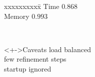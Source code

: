 \begin{frame}[fragile,label=ss-scaling]
\begin{center}
\begin{minipage}{4.0in}
\begin{minipage}[t]{1.20in}
\begin{block}
\begin{tabbing}
xxxxxxxxxx\=\kill
Time \> $0.868$ \\
Memory \> $0.993$
\end{tabbing}
\end{block}
\end{minipage} \
\begin{minipage}[t]{1.20in}
\blockred
\begin{block}<+->{Caveats}
load balanced \\
few refinement steps \\
startup ignored
\end{block}
\end{minipage}
\end{minipage}
\end{center}
\end{frame}

